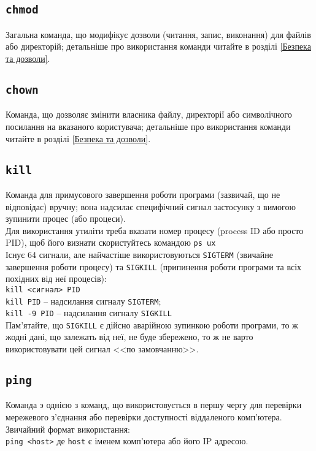\documentclass[10pt,a4paper]{fancyhandout}
\begin{document}
\subsection{\texttt{chmod}}
Загальна команда, що модифікує дозволи (читання, запис, виконання) для файлів або директорій; детальніше про використання команди читайте в розділі \ref{Безпека та дозволи}.
\goodbreak

\subsection{\texttt{chown}}
Команда, що дозволяє змінити власника файлу, директорії або символічного посилання на вказаного користувача; детальніше про використання команди читайте в розділі \ref{Безпека та дозволи}.
\goodbreak

\subsection{\texttt{kill}}
Команда для примусового завершення роботи програми (зазвичай, що не відповідає) вручну; вона надсилає специфічний сигнал застосунку з вимогою зупинити процес (або процеси). \\
Для використання утиліти треба вказати номер процесу (process ID або просто PID), щоб його визнати скористуйтесь командою \texttt{ps ux} \\
Існує 64 сигнали, але найчастіше використовуються \texttt{SIGTERM} (звичайне завершення роботи процесу) та \texttt{SIGKILL} (припинення роботи програми та всіх похідних від неї процесів): \\
\texttt{kill <сигнал> PID} \\
\texttt{kill PID} -- надсилання сигналу \texttt{SIGTERM}; \\
\texttt{kill -9 PID} -- надсилання сигналу \texttt{SIGKILL} \\
Пам'ятайте, що \texttt{SIGKILL} є дійсно аварійною зупинкою роботи програми, то ж жодні дані, що залежать від неї, не буде збережено, то ж не варто використовувати цей сигнал <<по замовчанню>>.
\goodbreak

\subsection{\texttt{ping}}
Команда э однією з команд, що використовується в першу чергу для перевірки мережевого з'єднання або перевірки доступності віддаленого комп'ютера. Звичайний формат використання: \\
\texttt{ping <host>} де \texttt{host} є іменем комп'ютера або його IP адресою.
\goodbreak
\end{document}
